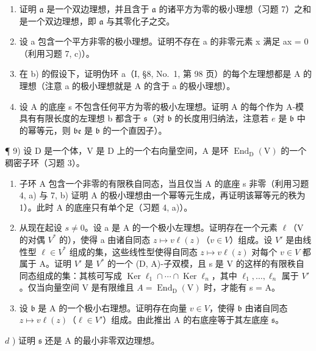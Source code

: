 \begin{enumerate}
\def\labelenumi{\alph{enumi})}
\item
  证明 \(\mathfrak{a}\) 是一个双边理想，并且含于 \(\mathfrak{a}\) 的诸平方为零的极小理想（习题 7）之和是一个双边理想，即 \(\mathfrak{a}\) 与其零化子之交。
\item
  设 a 包含一个平方非零的极小理想。证明不存在 a 的非零元素 x 满足 ax = 0（利用习题 7, c)）。
\item
  在 b) 的假设下，证明伪环 a（I, §8, No.~1, 第 98 页）的每个左理想都是 A 的理想（注意 a 的极小理想就是 A 的含于 a 的极小理想）。
\item
  设 A 的底座 s 不包含任何平方为零的极小左理想。证明 A 的每个作为 A-模具有有限长度的左理想 b 都含于 \(\mathfrak{s}\)（对 \(\mathfrak{b}\) 的长度用归纳法，注意若 \(e\) 是 \(\mathfrak{b}\) 中的幂等元，则 \(\mathfrak{be}\) 是 \(\mathfrak{b}\) 的一个直因子）。
\end{enumerate}

¶ 9) 设 D 是一个体，V 是 D 上的一个右向量空间，A 是环 \(\operatorname{End}_{\mathrm{D}}(\mathrm{V})\) 的一个稠密子环（习题 3）。

\begin{enumerate}
\def\labelenumi{\alph{enumi})}
\item
  子环 A 包含一个非零的有限秩自同态，当且仅当 A 的底座 s 非零（利用习题 4, a) 与 7, b) 证明 A 的极小理想由一个幂等元生成，再证明该幂等元的秩为 1）。此时 A 的底座只有单个足（习题 4, a)）。
\item
  从现在起设 \(s \neq 0\)。设 a 是 A 的一个极小左理想。证明存在一个元素 \(\ell\)（V 的对偶 \(V^{*}\) 的），使得 a 由诸自同态 \(z \mapsto v \ell(z)\)（\(v \in V\)）组成。设 \(V'\) 是由线性型 \(\ell \in V^{*}\) 组成的集，这些线性型使得自同态 \(z \mapsto v \ell(z)\) 对每个 \(v \in V\) 都属于 A。证明 \(V'\) 是 \(V^{*}\) 的一个 (D, A)-子双模，且 s 是 V 的这样的有限秩自同态组成的集：其核可写成 \(\operatorname{Ker} \ell_{1} \cap \cdots \cap \operatorname{Ker} \ell_{n}\)，其中 \(\ell_{1}, \ldots, \ell_{n}\) 属于 \(V'\)。仅当向量空间 V 是有限维且 \(A = \operatorname{End}_{\mathrm{D}}(\mathrm{V})\) 时，才能有 s = A。
\item
  设 \(\mathfrak{b}\) 是 A 的一个极小右理想。证明存在向量 \(v \in V\)，使得 \(\mathfrak{b}\) 由诸自同态 \(z \mapsto v\ell(z)\)（\(\ell \in V'\)）组成。由此推出 A 的右底座等于其左底座 \(\mathfrak{s}\)。
\end{enumerate}

\(d\) ) 证明 \(\mathfrak{s}\) 还是 A 的最小非零双边理想。

